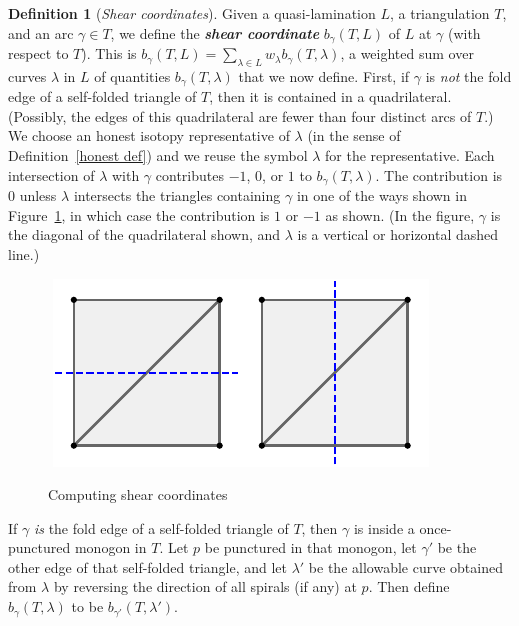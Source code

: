 \documentclass{amsart}
\theoremstyle{definition}
\newtheorem{definition}[proposition]{Definition}
\theoremstyle{remark}
\numberwithin{equation}{section}
\newcommand{\newword}[1]{\textbf{\emph{#1}}}
\newcommand{\0}{{\mathbf{0}}}
\begin{document}
\begin{definition}[\emph{Shear coordinates}]\label{shear def}
Given a quasi-lamination $L$, a triangulation $T$, and an arc $\gamma\in T$,  we define the \newword{shear coordinate} $b_\gamma(T,L)$ of $L$ at $\gamma$ (with respect to $T$).
This is $b_\gamma(T,L)=\sum_{\lambda\in L}w_\lambda b_\gamma(T,\lambda)$, a weighted sum over curves $\lambda$ in $L$ of quantities $b_\gamma(T,\lambda)$ that we now define.
First, if $\gamma$ is \emph{not} the fold edge of a self-folded triangle of $T$, then it is contained in a quadrilateral.
(Possibly, the edges of this quadrilateral are fewer than four distinct arcs of $T$.)
We choose an honest isotopy representative of $\lambda$ (in the sense of Definition~\ref{honest def}) and we reuse the symbol $\lambda$ for the representative.
Each intersection of $\lambda$ with $\gamma$ contributes $-1$, $0$, or $1$ to $b_\gamma(T,\lambda)$.
The contribution is $0$ unless $\lambda$ intersects the triangles containing $\gamma$ in one of the ways shown in Figure~\ref{shear fig}, in which case the contribution is $1$ or $-1$ as shown.
(In the figure, $\gamma$ is the diagonal of the quadrilateral shown, and $\lambda$ is a vertical or horizontal dashed line.)
\begin{figure}[ht]
\,\,\includegraphics{shearplus}\qquad\qquad\includegraphics{shearminus}\,\,
\caption{Computing shear coordinates}
\label{shear fig}
\end{figure}
If $\gamma$ \emph{is} the fold edge of a self-folded triangle of $T$, then $\gamma$ is inside a once-punctured monogon in $T$.
Let $p$ be punctured in that monogon, let $\gamma'$ be the other edge of that self-folded triangle, and let $\lambda'$ be the allowable curve obtained from $\lambda$ by reversing the direction of all spirals (if any) at  $p$.
Then define $b_\gamma(T,\lambda)$ to be $b_{\gamma'}(T,\lambda')$.
\end{definition}
\end{document}
